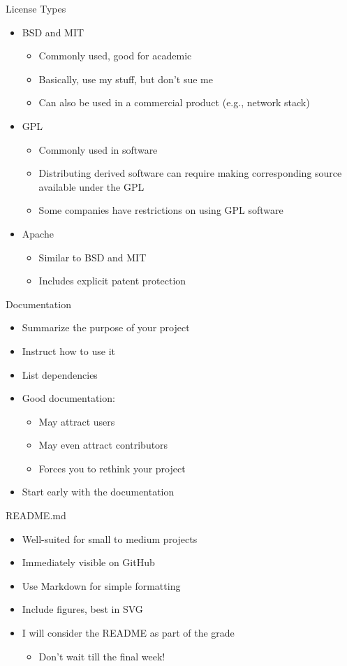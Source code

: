 \begin{frame}[fragile]{License Types}
\begin{itemize}
\item BSD and MIT
\begin{itemize}
\item Commonly used, good for academic
\item Basically, use my stuff, but don't sue me
\item Can also be used in a commercial product (e.g., network stack)
\end{itemize}
\item GPL
\begin{itemize}
\item Commonly used in software
\item Distributing derived software can require making corresponding source available under the GPL
\item Some companies have restrictions on using GPL software
\end{itemize}
\item Apache
\begin{itemize}
\item Similar to BSD and MIT
\item Includes explicit patent protection
\end{itemize}
\end{itemize}
\end{frame}


\begin{frame}[fragile]{Documentation}
\begin{itemize}
\item Summarize the purpose of your project
\item Instruct how to use it
\item List dependencies
\item Good documentation:
\begin{itemize}
\item May attract users
\item May even attract contributors
\item Forces you to rethink your project
\end{itemize}
\item Start early with the documentation
\end{itemize}
\end{frame}


\begin{frame}[fragile]{README.md}
\begin{itemize}
\item Well-suited for small to medium projects
\item Immediately visible on GitHub
\item Use Markdown for simple formatting
\item Include figures, best in SVG
\item I will consider the README as part of the grade
\begin{itemize}
\item Don't wait till the final week!
\end{itemize}
\end{itemize}
\end{frame}

